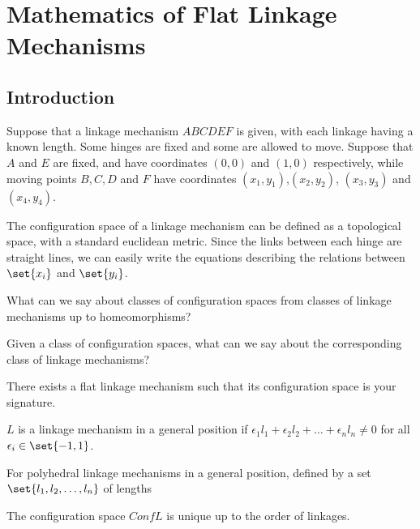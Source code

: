 \documentclass[11pt]{scrartcl}
\begin{document}
  \section{Mathematics of Flat Linkage Mechanisms}

  \subsection{Introduction}

  Suppose that a linkage mechanism $ABCDEF$ is given, with each
  linkage having a known length. Some hinges are fixed and some are
  allowed to move. Suppose that $A$ and $E$ are fixed, and have
  coordinates $(0, 0)$ and $(1, 0)$ respectively, while moving points
  $B, C, D$ and $F$ have coordinates $(x_{1},
  y_{1})$,$(x_{2}, y_{2})$, $(x_{3}, y_{3})$ and $(x_{4}, y_{4})$.
  
  The configuration space of a linkage mechanism can be defined as a
  topological space, with a standard euclidean metric. Since the links
  between each hinge are straight lines, we can easily write the
  equations describing the relations between $\set{x_{i}}$ and
  $\set{y_{i}}$.

  \begin{problem*}
    \hfill

    What can we say about classes of configuration spaces from classes
    of linkage mechanisms up to homeomorphisms?
  \end{problem*}

  \begin{problem*}
    \hfill

    Given a class of configuration spaces, what can we say about the
    corresponding class of linkage mechanisms?

  \end{problem*}

  \begin{theorem}[Thurston]
    There exists a flat linkage mechanism such that its configuration
    space is your signature.
  \end{theorem}
  \begin{definition}
    $L$ is a linkage mechanism in a general position if
    $\epsilon_{1}l_{1}+\epsilon_{2}l_{2}+\dots + \epsilon_{n}l_{n}
    \neq 0$ for all $\epsilon_{i} \in \set{-1, 1}$.
  \end{definition}

  \begin{definition}
    For polyhedral linkage mechanisms in a general position, defined
    by a set $\set{l_{1}, l_{2}, \dots, l_{n}}$ of lengths
  \end{definition}
  \begin{exercise}

    The configuration space $Conf L$ is unique up to the order of
    linkages.

  \end{exercise}
\end{document}
